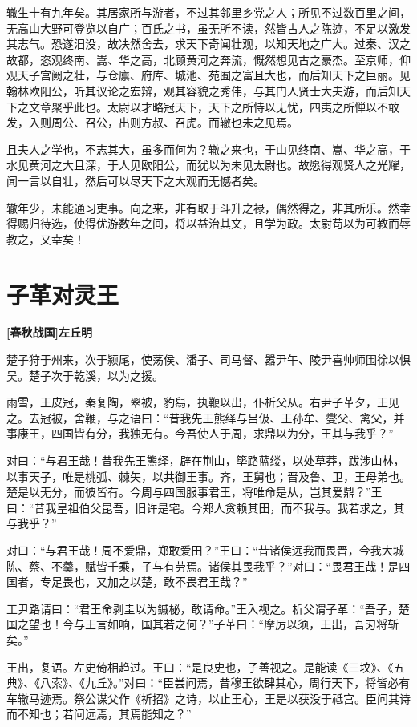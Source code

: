 \documentclass[UTF8,titlepage,oneside]{ctexbook}
\begin{document}
辙生十有九年矣。其居家所与游者，不过其邻里乡党之人；所见不过数百里之间，无高山大野可登览以自广；百氏之书，虽无所不读，然皆古人之陈迹，不足以激发其志气。恐遂汩没，故决然舍去，求天下奇闻壮观，以知天地之广大。过秦、汉之故都，恣观终南、嵩、华之高，北顾黄河之奔流，慨然想见古之豪杰。至京师，仰观天子宫阙之壮，与仓廪、府库、城池、苑囿之富且大也，而后知天下之巨丽。见翰林欧阳公，听其议论之宏辩，观其容貌之秀伟，与其门人贤士大夫游，而后知天下之文章聚乎此也。太尉以才略冠天下，天下之所恃以无忧，四夷之所惮以不敢发，入则周公、召公，出则方叔、召虎。而辙也未之见焉。

且夫人之学也，不志其大，虽多而何为？辙之来也，于山见终南、嵩、华之高，于水见黄河之大且深，于人见欧阳公，而犹以为未见太尉也。故愿得观贤人之光耀，闻一言以自壮，然后可以尽天下之大观而无憾者矣。

辙年少，未能通习吏事。向之来，非有取于斗升之禄，偶然得之，非其所乐。然幸得赐归待选，使得优游数年之间，将以益治其文，且学为政。太尉苟以为可教而辱教之，又幸矣！


\chapter*{子革对灵王}
\begin{center}
	\textbf{[春秋战国]左丘明}
\end{center}


楚子狩于州来，次于颍尾，使荡侯、潘子、司马督、嚣尹午、陵尹喜帅师围徐以惧吴。楚子次于乾溪，以为之援。


雨雪，王皮冠，秦复陶，翠被，豹舄，执鞭以出，仆析父从。右尹子革夕，王见之。去冠被，舍鞭，与之语曰：“昔我先王熊绎与吕伋、王孙牟、燮父、禽父，并事康王，四国皆有分，我独无有。今吾使人于周，求鼎以为分，王其与我乎？”


对曰：“与君王哉！昔我先王熊绎，辟在荆山，筚路蓝缕，以处草莽，跋涉山林，以事天子，唯是桃弧、棘矢，以共御王事。齐，王舅也；晋及鲁、卫，王母弟也。楚是以无分，而彼皆有。今周与四国服事君王，将唯命是从，岂其爱鼎？”王曰：“昔我皇祖伯父昆吾，旧许是宅。今郑人贪赖其田，而不我与。我若求之，其与我乎？”


对曰：“与君王哉！周不爱鼎，郑敢爱田？”王曰：“昔诸侯远我而畏晋，今我大城陈、蔡、不羹，赋皆千乘，子与有劳焉。诸侯其畏我乎？”对曰：“畏君王哉！是四国者，专足畏也，又加之以楚，敢不畏君王哉？”


工尹路请曰：“君王命剥圭以为鏚柲，敢请命。”王入视之。析父谓子革：“吾子，楚国之望也！今与王言如响，国其若之何？”子革曰：“摩厉以须，王出，吾刃将斩矣。”


王出，复语。左史倚相趋过。王曰：“是良史也，子善视之。是能读《三坟》、《五典》、《八索》、《九丘》。”对曰：“臣尝问焉，昔穆王欲肆其心，周行天下，将皆必有车辙马迹焉。祭公谋父作《祈招》之诗，以止王心，王是以获没于祗宫。臣问其诗而不知也；若问远焉，其焉能知之？”
\end{document}
